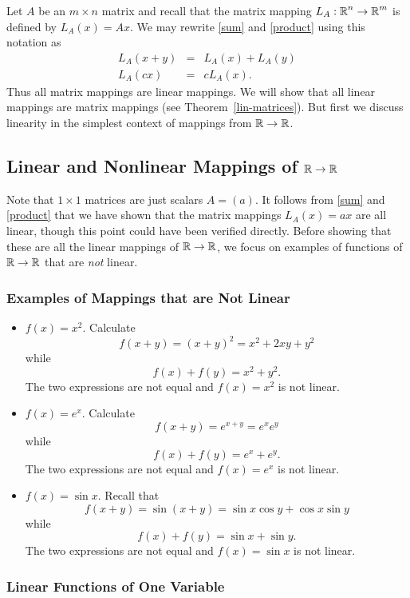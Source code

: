 \documentclass{ximera}
\begin{document}
Let $A$ be an $m\times n$ matrix and recall that the matrix mapping
$L_A:\mbox{$\Bbb{R}$}^n\to\mbox{$\Bbb{R}$}^m$ is defined by $L_A(x)=Ax$.  We may rewrite \eqref{sum} and
\eqref{product} using this notation as
\begin{eqnarray*}
L_A(x+y) & = & L_A(x) + L_A(y) \\
L_A(cx) & = & cL_A(x).
\end{eqnarray*}
Thus all matrix mappings are linear
mappings.  We will show that all linear
mappings are matrix mappings (see Theorem~\ref{lin-matrices}).  But first
we discuss linearity in the simplest context of mappings from $\mbox{$\Bbb{R}$}\to\mbox{$\Bbb{R}$}$.

\subsection*{Linear and Nonlinear Mappings of $\mbox{$\Bbb{R}$}\to\mbox{$\Bbb{R}$}$}

Note that $1\times 1$ matrices are just scalars $A=(a)$.  It follows from
\eqref{sum} and \eqref{product} that we have shown that the matrix mappings
$L_A(x)=ax$ are all linear, though this point could have been verified
directly.  Before showing that these are all the linear mappings of
$\mbox{$\Bbb{R}$}\to\mbox{$\Bbb{R}$}$, we focus on examples of functions of $\mbox{$\Bbb{R}$}\to\mbox{$\Bbb{R}$}$ that are
{\em not\/} linear.

\subsubsection*{Examples of Mappings that are Not Linear}

\begin{itemize}
\item   $f(x)=x^2$.  Calculate
\[
f(x+y) = (x+y)^2 = x^2+2xy+y^2
\]
while
\[
f(x)+f(y) = x^2 + y^2.
\]
The two expressions are not equal and $f(x)=x^2$ is not linear.
\item   $f(x)=e^x$.  Calculate
\[
f(x+y) = e^{x+y} = e^x e^y
\]
while
\[
f(x)+f(y) = e^x + e^y.
\]
The two expressions are not equal and $f(x)=e^x$ is not linear.
\item   $f(x) = \sin x$.  Recall that
\[
f(x+y) =\sin(x+y) = \sin x \cos y +\cos x \sin y
\]
while
\[
f(x)+f(y) = \sin x + \sin y.
\]
The two expressions are not equal and $f(x)=\sin x $ is not
linear.
\end{itemize}

\subsubsection*{Linear Functions of One Variable}
\end{document}
